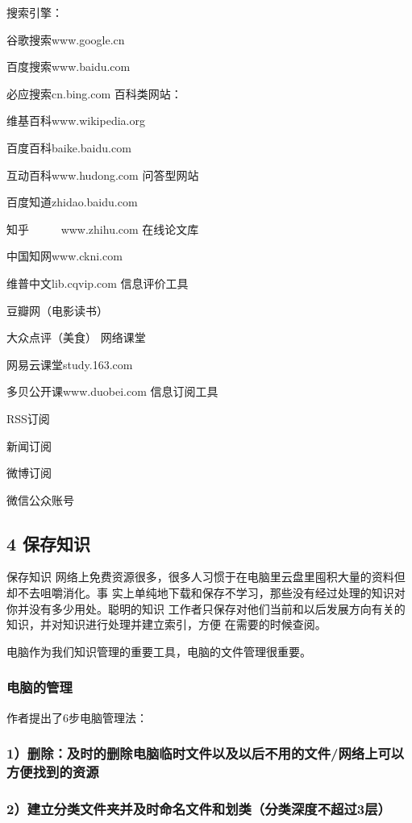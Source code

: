 \documentclass[11pt]{ctexart}
\begin{document}
{{{{搜索引擎：

谷歌搜索www.google.cn

百度搜索www.baidu.com

必应搜索cn.bing.com
百科类网站：

维基百科www.wikipedia.org

百度百科baike.baidu.com

互动百科www.hudong.com
问答型网站

百度知道zhidao.baidu.com

知乎       www.zhihu.com
在线论文库

中国知网www.ckni.com

维普中文lib.cqvip.com
信息评价工具

豆瓣网（电影读书）

大众点评（美食）
网络课堂

网易云课堂study.163.com

多贝公开课www.duobei.com
信息订阅工具

RSS订阅

新闻订阅

微博订阅

微信公众账号
\subsection{4 保存知识}
\label{sec:org3835d53}

保存知识
网络上免费资源很多，很多人习惯于在电脑里云盘里囤积大量的资料但却不去咀嚼消化。事
实上单纯地下载和保存不学习，那些没有经过处理的知识对你并没有多少用处。聪明的知识
工作者只保存对他们当前和以后发展方向有关的知识，并对知识进行处理并建立索引，方便
在需要的时候查阅。

电脑作为我们知识管理的重要工具，电脑的文件管理很重要。

\subsubsection{电脑的管理}
\label{sec:orga165867}
作者提出了6步电脑管理法：

\subsubsection{1）删除：及时的删除电脑临时文件以及以后不用的文件/网络上可以方便找到的资源}
\label{sec:org7a18579}

\subsubsection{2）建立分类文件夹并及时命名文件和划类（分类深度不超过3层）}
\label{sec:orgfe1a3cf}

}}}}
\end{document}
